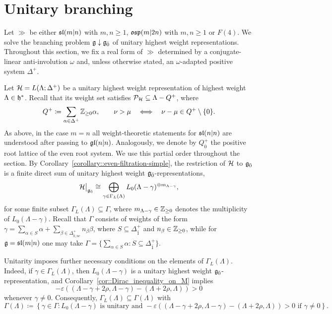\section{Unitary branching}\label{sec::unitary_branching}\noindent
Let $\gg$ be either $\sl(m\vert n)$ with $m,n\geq1$, $\osp(m\vert 2n)$ with $m,n\geq1$ or $F(4)$. We solve the branching problem $\gg\downarrow \even$ of unitary highest weight representations. Throughout this section, we fix a real form of $\gg$ determined by a conjugate-linear anti-involution $\omega$ and, unless otherwise stated, an $\omega$-adapted positive system $\Delta^{+}$.

Let $\HH=L(\Lambda;\Delta^{+})$ be a unitary highest weight representation of highest weight $\Lambda\in\hh^{\ast}$. Recall that its weight set satisfies $\mathcal P_{\HH}\subseteq\Lambda-Q^{+}$, where
\begin{equation}
Q^{+}\coloneqq\sum_{\alpha\in\Delta^{+}}\ZZ_{\geq0}\alpha,
\qquad
\nu>\mu
\quad\Longleftrightarrow\quad
\nu-\mu\in Q^{+}\setminus\{0\}.
\end{equation}
As above, in the case $m=n$ all weight-theoretic statements for
$\sl(n\vert n)$ are understood after passing to $\gl(n\vert n)$.
Analogously, we denote by $Q_{\bar{0}}^{+}$ the positive root lattice of the even root system. We use this partial order throughout the section. By Corollary~\ref{corollary::even-filtration-simple}, the restriction of $\HH$ to $\even$ is a finite direct sum of unitary highest weight $\even$-representations,
\begin{equation}
\HH\big\vert_{\even}
\cong
\bigoplus_{\gamma\in\Gamma_{L}(\Lambda)}
L_0(\Lambda-\gamma)^{\oplus m_{\Lambda-\gamma}},
\end{equation}
for some finite subset $\Gamma_{L}(\Lambda)\subseteq\Gamma$, where $m_{\Lambda-\gamma}\in\ZZ_{\geq0}$ denotes the multiplicity of $L_0(\Lambda-\gamma)$. Recall that $\Gamma$ consists of weights of the form $\gamma=\sum_{\alpha\in S}\alpha+\sum_{\beta\in\Delta_{\bar0,nc}^{+}}n_\beta\beta$, where $S\subseteq\Delta_{\bar1}^{+}$ and $n_\beta\in\ZZ_{\geq0}$, while for $\gg=\sl(m\vert n)$ one may take $\Gamma=\{\sum_{\alpha\in S}\alpha:S\subseteq\Delta_{\bar1}^{+}\}$.

Unitarity imposes further necessary conditions on the elements of $\Gamma_{L}(\Lambda)$. Indeed, if $\gamma\in\Gamma_{L}(\Lambda)$, then $L_0(\Lambda-\gamma)$ is a unitary highest weight $\even$-representation, and Corollary~\ref{cor::Dirac_inequality_on_M} implies
\begin{equation}
-\varepsilon
\left(
(\Lambda-\gamma+2\rho,\Lambda-\gamma)
-
(\Lambda+2\rho,\Lambda)
\right)
>0
\end{equation}
whenever $\gamma\neq0$. Consequently, $\Gamma_{L}(\Lambda)
\subseteq \Gamma(\Lambda)$ with
\begin{equation}
\Gamma(\Lambda)\coloneqq
\left\{
\gamma\in\Gamma:
L_0(\Lambda-\gamma)\text{ is unitary and }
-\varepsilon
\left(
(\Lambda-\gamma+2\rho,\Lambda-\gamma)
-
(\Lambda+2\rho,\Lambda)
\right)>0
\text{ if }\gamma\neq0
\right\}.
\end{equation}

